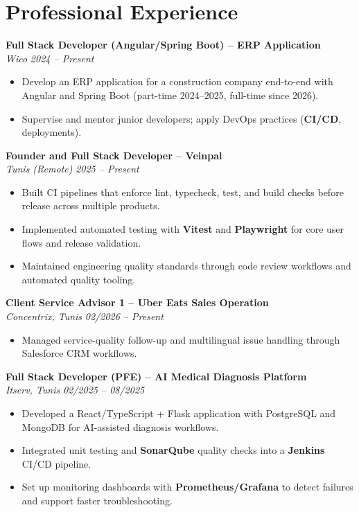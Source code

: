 \documentclass[10pt,a4paper]{article}
\begin{document}
\vspace{2pt}

\section*{Professional Experience}
{\small

\textbf{Full Stack Developer (Angular/Spring Boot) -- ERP Application}\\[1pt]
\textit{Wico} \hfill \textit{2024 -- Present}
\begin{itemize}
  \item Develop an ERP application for a construction company end-to-end with Angular and Spring Boot (part-time 2024--2025, full-time since 2026).
  \item Supervise and mentor junior developers; apply DevOps practices (\textbf{CI/CD}, deployments).
\end{itemize}

\vspace{2pt}
\textbf{Founder and Full Stack Developer -- Veinpal}\\[1pt]
\textit{Tunis (Remote)} \hfill \textit{2025 -- Present}
\begin{itemize}
  \item Built CI pipelines that enforce lint, typecheck, test, and build checks before release across multiple products.
  \item Implemented automated testing with \textbf{Vitest} and \textbf{Playwright} for core user flows and release validation.
  \item Maintained engineering quality standards through code review workflows and automated quality tooling.
\end{itemize}

\vspace{2pt}
\textbf{Client Service Advisor 1 -- Uber Eats Sales Operation}\\[1pt]
\textit{Concentrix, Tunis} \hfill \textit{02/2026 -- Present}
\begin{itemize}
  \item Managed service-quality follow-up and multilingual issue handling through Salesforce CRM workflows.
\end{itemize}

\vspace{2pt}
\textbf{Full Stack Developer (PFE) -- AI Medical Diagnosis Platform}\\[1pt]
\textit{Itserv, Tunis} \hfill \textit{02/2025 -- 08/2025}
\begin{itemize}
  \item Developed a React/TypeScript + Flask application with PostgreSQL and MongoDB for AI-assisted diagnosis workflows.
  \item Integrated unit testing and \textbf{SonarQube} quality checks into a \textbf{Jenkins} CI/CD pipeline.
  \item Set up monitoring dashboards with \textbf{Prometheus/Grafana} to detect failures and support faster troubleshooting.
\end{itemize}

}
\end{document}
